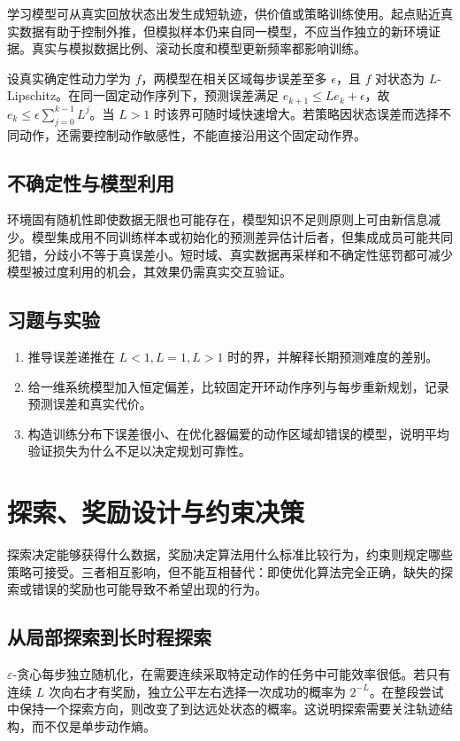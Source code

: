 \documentclass[UTF8,12pt,a4paper,fontset=fandol]{ctexbook}
\begin{document}
学习模型可从真实回放状态出发生成短轨迹，供价值或策略训练使用。起点贴近真实数据有助于控制外推，但模拟样本仍来自同一模型，不应当作独立的新环境证据。真实与模拟数据比例、滚动长度和模型更新频率都影响训练。

设真实确定性动力学为 $f$，两模型在相关区域每步误差至多 $\epsilon$，且 $f$ 对状态为 $L$-Lipschitz。在同一固定动作序列下，预测误差满足 $e_{k+1}\leq Le_k+\epsilon$，故 $e_k\leq\epsilon\sum_{j=0}^{k-1}L^j$。当 $L>1$ 时该界可随时域快速增大。若策略因状态误差而选择不同动作，还需要控制动作敏感性，不能直接沿用这个固定动作界。

\section{不确定性与模型利用}

环境固有随机性即使数据无限也可能存在，模型知识不足则原则上可由新信息减少。模型集成用不同训练样本或初始化的预测差异估计后者，但集成成员可能共同犯错，分歧小不等于真误差小。短时域、真实数据再采样和不确定性惩罚都可减少模型被过度利用的机会，其效果仍需真实交互验证。

\section{习题与实验}
\begin{enumerate}
\item 推导误差递推在 $L<1,L=1,L>1$ 时的界，并解释长期预测难度的差别。
\item 给一维系统模型加入恒定偏差，比较固定开环动作序列与每步重新规划，记录预测误差和真实代价。
\item 构造训练分布下误差很小、在优化器偏爱的动作区域却错误的模型，说明平均验证损失为什么不足以决定规划可靠性。
\end{enumerate}

\chapter{探索、奖励设计与约束决策}
\label{ch:rl-exploration}

探索决定能够获得什么数据，奖励决定算法用什么标准比较行为，约束则规定哪些策略可接受。三者相互影响，但不能互相替代：即使优化算法完全正确，缺失的探索或错误的奖励也可能导致不希望出现的行为。

\section{从局部探索到长时程探索}

$\varepsilon$-贪心每步独立随机化，在需要连续采取特定动作的任务中可能效率很低。若只有连续 $L$ 次向右才有奖励，独立公平左右选择一次成功的概率为 $2^{-L}$。在整段尝试中保持一个探索方向，则改变了到达远处状态的概率。这说明探索需要关注轨迹结构，而不仅是单步动作熵。
\end{document}
